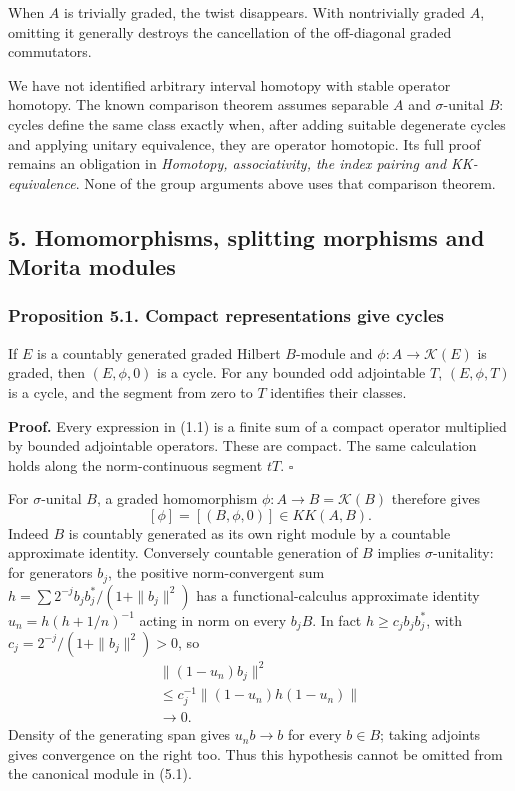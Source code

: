 \documentclass[
  11pt,
]{article}
\begin{document}
When \(A\) is trivially graded, the twist disappears. With nontrivially
graded \(A\), omitting it generally destroys the cancellation of the
off-diagonal graded commutators.

We have not identified arbitrary interval homotopy with stable operator
homotopy. The known comparison theorem assumes separable \(A\) and
\(\sigma\)-unital \(B\): cycles define the same class exactly when,
after adding suitable degenerate cycles and applying unitary
equivalence, they are operator homotopic. Its full proof remains an
obligation in \emph{Homotopy, associativity, the index pairing and
KK-equivalence}. None of the group arguments above uses that comparison
theorem.

\subsection{5. Homomorphisms, splitting morphisms and Morita
modules}\label{homomorphisms-splitting-morphisms-and-morita-modules}

\subsubsection{Proposition 5.1. Compact representations give
cycles}\label{proposition-5.1.-compact-representations-give-cycles}

If \(E\) is a countably generated graded Hilbert \(B\)-module and
\(\phi:A\to\mathcal K(E)\) is graded, then \((E,\phi,0)\) is a cycle.
For any bounded odd adjointable \(T\), \((E,\phi,T)\) is a cycle, and
the segment from zero to \(T\) identifies their classes.

\textbf{Proof.} Every expression in (1.1) is a finite sum of a compact
operator multiplied by bounded adjointable operators. These are compact.
The same calculation holds along the norm-continuous segment \(tT\).
\(\square\)

For \(\sigma\)-unital \(B\), a graded homomorphism
\(\phi:A\to B=\mathcal K(B)\) therefore gives \[
[\phi]=[(B,\phi,0)]\in KK(A,B).
\tag{5.1}
\] Indeed \(B\) is countably generated as its own right module by a
countable approximate identity. Conversely countable generation of \(B\)
implies \(\sigma\)-unitality: for generators \(b_j\), the positive
norm-convergent sum \(h=\sum 2^{-j}b_jb_j^*/(1+\|b_j\|^2)\) has a
functional-calculus approximate identity \(u_n=h(h+1/n)^{-1}\) acting in
norm on every \(b_jB\). In fact \(h\geq c_jb_jb_j^*\), with
\(c_j=2^{-j}/(1+\|b_j\|^2)>0\), so \[
\begin{gathered}
\|(1-u_n)b_j\|^2
\\\leq c_j^{-1}\|(1-u_n)h(1-u_n)\|
\\\longrightarrow0.
\end{gathered}
\] Density of the generating span gives \(u_nb\to b\) for every
\(b\in B\); taking adjoints gives convergence on the right too. Thus
this hypothesis cannot be omitted from the canonical module in (5.1).
\end{document}
